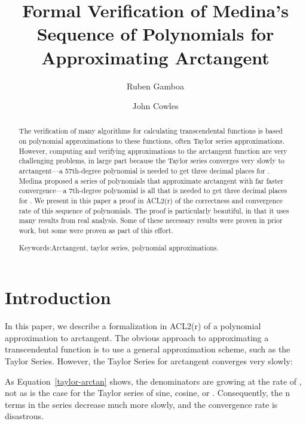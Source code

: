 \documentclass[copyright,creativecommons]{eptcs}
\newcommand{\keywordname}{Keywords:}
\newcommand{\keywords}[1]{\par\addvspace\baselineskip\noindent\keywordname\enspace\ignorespaces#1}
\begin{document}
\title{Formal Verification of Medina's Sequence of Polynomials for Approximating Arctangent}
\def\titlerunning{Polynomial Approximations to Arctangent in ACL2}
\def\authorrunning{Ruben Gamboa \& John Cowles}

\author{Ruben Gamboa 
\and
John Cowles
}

\maketitle

\begin{abstract}
The verification of many algorithms for calculating transcendental functions is based on polynomial approximations to these functions, often Taylor series approximations. However, computing and verifying approximations to the arctangent function are very challenging problems, in large part because the Taylor series converges very slowly to arctangent---a 57th-degree polynomial is needed to get three decimal places for . Medina proposed a series of polynomials that approximate arctangent with far faster convergence---a 7th-degree polynomial is all that is needed to get three decimal places for . We present in this paper a proof in ACL2(r) of the correctness and convergence rate of this sequence of polynomials. The proof is particularly beautiful, in that it uses many results from real analysis. Some of these necessary results were proven in prior work, but some were proven as part of this effort.

\keywords{Arctangent, taylor series, polynomial approximations.}
\end{abstract}

\section{Introduction}
\label{intro}

In this paper, we describe a formalization in ACL2(r) of a polynomial
approximation to arctangent. The obvious approach to approximating a
transcendental function is to use a general approximation scheme, such
as the Taylor Series. However, the Taylor Series for arctangent converges
very slowly:

As Equation~\ref{taylor-arctan} shows, the denominators are growing at
the rate of , not  as is the case for the Taylor series
of sine, cosine, or . Consequently, the n terms in
the series decrease much more slowly, and the convergence rate is
disastrous.
\end{document}
